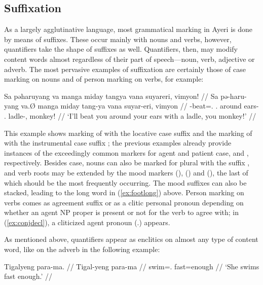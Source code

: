 \subsection{Suffixation}

As a largely agglutinative language, most grammatical marking in Ayeri is done 
by means of suffixes. These occur mainly with nouns and verbs, however, 
quantifiers take the shape of suffixes as well. Quantifiers, then, may modify 
content words almost regardless of their part of speech---noun, verb, adjective 
or adverb. The most pervasive examples of suffixation are certainly those of 
case marking on nouns and of person marking on verbs, for example:

\ex\label{ex:conjdecl}\begingl
	\gla Sa pəharuyang va manga miday tangya vana suyareri, vimyon! //
	\glb Sa pə-haru-yang va.Ø manga miday tang-ya vana suyar-eri, vimyon //
	\glc \PatT{} \NFut{}-beat=\Fsg{}.\Aarg{} \Ssg{}.\Top{} \Dyn{} around 
		ears-\Loc{} \Ssg{}.\Gen{} ladle-\Ins{}, monkey! //
	\glft `I'll beat you around your ears with a ladle, you monkey!' //
\endgl\xe

This example shows marking of  with the locative case 
suffix  and the marking of  with the 
instrumental case suffix ; the previous examples already 
provide instances of the exceedingly common markers for agent and patient 
case,  and , respectively. Besides case, nouns 
can also be marked for plural with the suffix , and verb roots 
may be extended by the mood markers  (\Irr{}), 
 (\Hab{}) and  (\Neg{}), the last of which should 
be the most frequently occurring. The mood suffixes can also be stacked, leading 
to the long word in (\ref{ex:footlong}) above. Person marking on verbs comes as 
agreement suffix or as a clitic personal pronoun depending on whether an agent 
NP proper is present or not for the verb to agree with; in (\ref{ex:conjdecl}), 
a cliticized agent pronoun  (\TsgM{}.\Aarg{}) appears.

As mentioned above, quantifiers appear as enclitics on almost any type of 
content word, like on the adverb  in the following example:

\ex
\begingl
	\gla Tigalyeng para-ma. //
	\glb Tigal-yeng para-ma //
	\glc swim=\TsgF{}.\Aarg{} fast=enough //
	\glft `She swims fast enough.' //
\endgl

